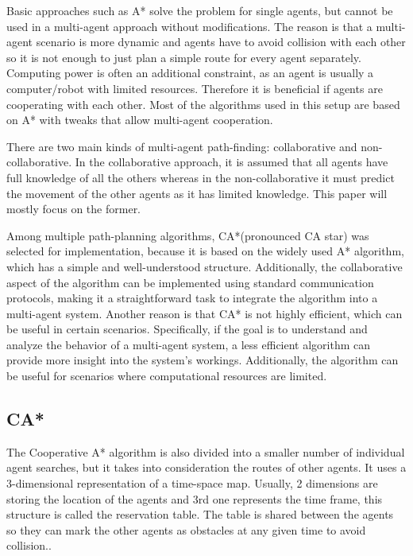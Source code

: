 Basic approaches such as A* solve the problem for single agents, but cannot be used in a multi-agent approach without modifications. The reason is that a multi-agent scenario is more dynamic and agents have to avoid collision with each other so it is not enough to just plan a simple route for every agent separately. Computing power is often an additional constraint, as an agent is usually a computer/robot with limited resources. Therefore it is beneficial if agents are cooperating with each other. Most of the algorithms used in this setup are based on A* with tweaks that allow multi-agent cooperation\cite{path_adv}.

There are two main kinds of multi-agent path-finding: collaborative and non-collaborative. In the collaborative approach, it is assumed that all agents have full knowledge of all the others whereas in the non-collaborative it must predict the movement of the other agents as it has limited knowledge. This paper will mostly focus on the former. 

Among multiple path-planning algorithms, CA*(pronounced CA star) was selected for implementation, because it is based on the widely used A* algorithm, which has a simple and well-understood structure. Additionally, the collaborative aspect of the algorithm can be implemented using standard communication protocols, making it a straightforward task to integrate the algorithm into a multi-agent system. Another reason is that CA* is not highly efficient, which can be useful in certain scenarios. Specifically, if the goal is to understand and analyze the behavior of a multi-agent system, a less efficient algorithm can provide more insight into the system's workings. Additionally, the algorithm can be useful for scenarios where computational resources are limited.

\subsection{CA*}
The Cooperative A* algorithm is also divided into a smaller number of individual agent searches, but it takes into consideration the routes of other agents. It uses a 3-dimensional representation of a time-space map. Usually, 2 dimensions are storing the location of the agents and 3rd one represents the time frame, this structure is called the reservation table. The table is shared between the agents so they can mark the other agents as obstacles at any given time to avoid collision.\cite{path_adv}. 

